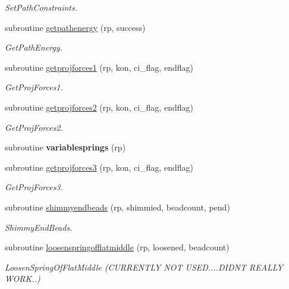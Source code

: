 \begin{DoxyCompactItemize}
\begin{DoxyCompactList}\small\item\em Set\+Path\+Constraints. \end{DoxyCompactList}\item 
subroutine \mbox{\hyperlink{namespacerpath_ac8b51bb543056270fc034d75ba2a7266}{getpathenergy}} (rp, success)
\begin{DoxyCompactList}\small\item\em Get\+Path\+Energy. \end{DoxyCompactList}\item 
subroutine \mbox{\hyperlink{namespacerpath_a1faa43d82cebd49dbfb23e87189db2c2}{getprojforces1}} (rp, kon, ci\+\_\+flag, endflag)
\begin{DoxyCompactList}\small\item\em Get\+Proj\+Forces1. \end{DoxyCompactList}\item 
subroutine \mbox{\hyperlink{namespacerpath_ac95367fc9bf411eca8d31874d5e3e703}{getprojforces2}} (rp, kon, ci\+\_\+flag, endflag)
\begin{DoxyCompactList}\small\item\em Get\+Proj\+Forces2. \end{DoxyCompactList}\item 
\mbox{\label{namespacerpath_a73d1e89cffa30d46b66bfbd445e3e0f4}} 
subroutine {\bfseries variablesprings} (rp)
\item 
subroutine \mbox{\hyperlink{namespacerpath_a79ee81833120305547c237a755918472}{getprojforces3}} (rp, kon, ci\+\_\+flag, endflag)
\begin{DoxyCompactList}\small\item\em Get\+Proj\+Forces3. \end{DoxyCompactList}\item 
subroutine \mbox{\hyperlink{namespacerpath_aae808f74fd2e658a175c79600c5bfe34}{shimmyendbeads}} (rp, shimmied, beadcount, pend)
\begin{DoxyCompactList}\small\item\em Shimmy\+End\+Beads. \end{DoxyCompactList}\item 
subroutine \mbox{\hyperlink{namespacerpath_ae42b5c49527891229d00dfab8a17bd90}{loosenspringofflatmiddle}} (rp, loosened, beadcount)
\begin{DoxyCompactList}\small\item\em Loosen\+Spring\+Of\+Flat\+Middle (C\+U\+R\+R\+E\+N\+T\+LY N\+OT U\+S\+ED....D\+I\+D\+NT R\+E\+A\+L\+LY W\+O\+RK..) \end{DoxyCompactList}\item 

\end{DoxyCompactItemize}
